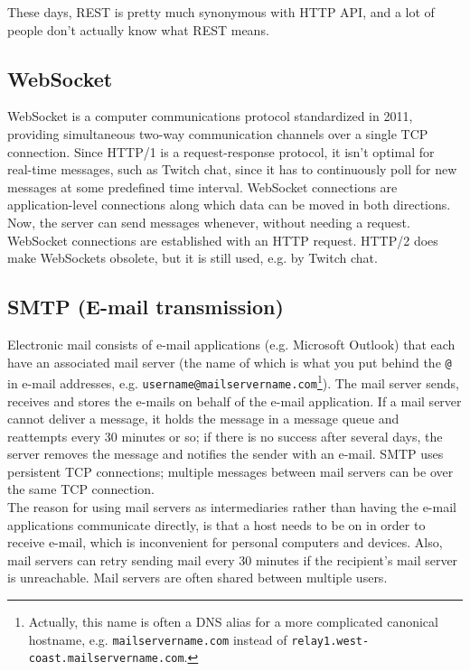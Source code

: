 \documentclass[8pt, table, xcdraw]{article}%
\begin{document}
These days, REST is pretty much synonymous with HTTP API, and a lot of people don't actually know what REST means.

\subsection{WebSocket}

WebSocket is a computer communications protocol standardized in 2011, providing simultaneous two-way communication channels over a single TCP connection. Since HTTP/1 is a request-response protocol, it isn't optimal for real-time messages, such as Twitch chat, since it has to continuously poll for new messages at some predefined time interval. WebSocket connections are application-level connections along which data can be moved in both directions. Now, the server can send messages whenever, without needing a request. WebSocket connections are established with an HTTP request. HTTP/2 does make WebSockets obsolete, but it is still used, e.g. by Twitch chat.

\subsection{SMTP (E-mail transmission)}

Electronic mail consists of e-mail applications (e.g. Microsoft Outlook) that each have an associated mail server (the name of which is what you put behind the \texttt{@} in e-mail addresses, e.g. \texttt{username@mailservername.com}\footnote{Actually, this name is often a DNS alias for a more complicated canonical hostname, e.g. \texttt{mailservername.com} instead of \texttt{relay1.west-coast.mailservername.com}.}). The mail server sends, receives and stores the e-mails on behalf of the e-mail application. If a mail server cannot deliver a message, it holds the message in a message queue and reattempts every 30 minutes or so; if there is no success after several days, the server removes the message and notifies the sender with an e-mail. SMTP uses persistent TCP connections; multiple messages between mail servers can be over the same TCP connection.\\
The reason for using mail servers as intermediaries rather than having the e-mail applications communicate directly, is that a host needs to be on in order to receive e-mail, which is inconvenient for personal computers and devices. Also, mail servers can retry sending mail every 30 minutes if the recipient's mail server is unreachable. Mail servers are often shared between multiple users.
\end{document}
